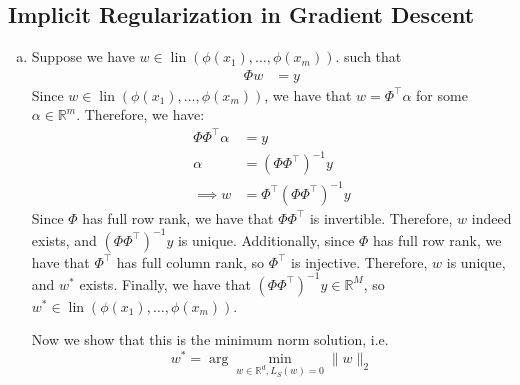 \documentclass{amsart}
\newcommand{\rr}{\mathbb R}    %
\DeclareMathOperator{\lin}{lin}
\theoremstyle{definition}
\begin{document}
\subsection{Implicit Regularization in Gradient Descent}
\begin{enumerate}[(a)]
  \item 
    Suppose we have $w \in \lin(\phi(x_1), \ldots, \phi(x_m))$. such that 
    \begin{align*}
      \Phi w &= y
    \end{align*}
    Since $w \in \lin(\phi(x_1), \ldots, \phi(x_m))$, we have that $w = \Phi^\top \alpha$ for some $\alpha \in \rr^m$. Therefore, we have:
    \begin{align*}
      \Phi \Phi^\top \alpha &= y\\
      \alpha &= (\Phi \Phi^\top)^{-1} y\\
      \implies w &= \Phi^\top (\Phi \Phi^\top)^{-1} y
    \end{align*}
    Since $\Phi$ has full row rank, we have that $\Phi \Phi^\top$ is invertible. Therefore, $w$ indeed exists, and $(\Phi \Phi^\top)^{-1} y$ is unique. 
    Additionally, since $\Phi$ has full row rank, we have that $\Phi^\top$ has full column rank, so $\Phi^\top$ is injective. 
    Therefore, $w$ is unique, and $w^\ast$ exists.
    Finally, we have that $(\Phi \Phi^\top)^{-1} y \in \rr^M$, so $w^\ast \in \lin(\phi(x_1), \ldots, \phi(x_m))$.

    Now we show that this is the minimum norm solution, i.e. 
    \[w^\ast = \arg \min_{w \in \rr^d, L_S(w) = 0} \|w\|_2\]


\end{enumerate}
\end{document}
